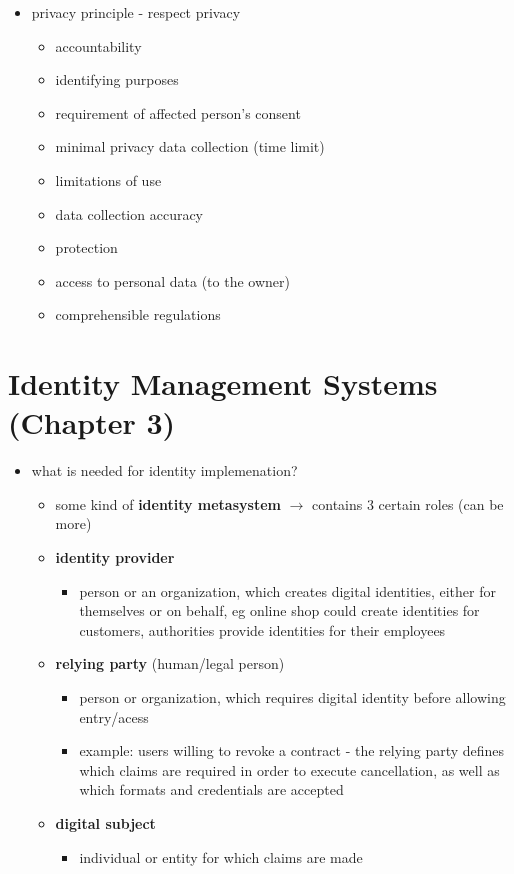 \documentclass[11pt]{article}
\begin{document}
\begin{itemize}
\begin{itemize}
\begin{itemize}
\end{itemize}
\end{itemize}
\item privacy principle - respect privacy
\begin{itemize}
\item accountability
\item identifying purposes
\item requirement of affected person's consent
\item minimal privacy data collection (time limit)
\item limitations of use
\item data collection accuracy
\item protection
\item access to personal data (to the owner)
\item comprehensible regulations
\end{itemize}
\end{itemize}

\section{Identity Management Systems (Chapter 3)}
\label{sec:orge42d64e}
\begin{itemize}
\item what is needed for identity implemenation?
\begin{itemize}
\item some kind of \textbf{identity metasystem} \(\rightarrow\) contains 3 certain roles (can be more)
\item \textbf{identity provider}
\begin{itemize}
\item person or an organization, which creates digital identities, either for themselves or on behalf, eg online shop could create identities for customers, authorities provide identities for their employees
\end{itemize}
\item \textbf{relying party} (human/legal person)
\begin{itemize}
\item person or organization, which requires digital identity before allowing entry/acess
\item example: users willing to revoke a contract - the relying party defines which claims are required in order to execute cancellation, as well as which formats and credentials are accepted
\end{itemize}
\item \textbf{digital subject}
\begin{itemize}
\item individual or entity for which claims are made
\end{itemize}
\end{itemize}
\end{itemize}
\end{document}
